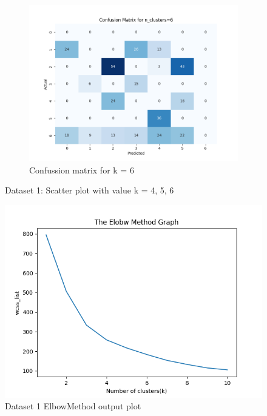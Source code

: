 \documentclass[12pt]{report}
\begin{document}
\begin{figure}[H]
\begin{subfigure}{.6\textwidth}
			\includegraphics[width=.9\linewidth]{../K-means/Output/Dataset1/confusionMatrix_k=6.png}
			\caption{Confussion matrix for k = 6}
			\label{Dataset1ConfusionMatrixk6}
		\end{subfigure}
		\caption{Dataset 1: Scatter plot with value k = 4, 5, 6}
		\label{Dataset1ConfussionMatrix456}
	\end{figure}

	\begin{figure}[H]
		\centering
		\includegraphics[scale=0.7]{../K-means/Output/Dataset1/ElbowMethod.png}
		\caption{Dataset 1 ElbowMethod output plot}
		\label{dataset1ElobowMethod}
	\end{figure}
\end{document}
